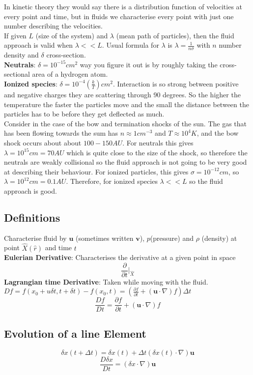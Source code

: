 \documentclass{article}
\begin{document}
In kinetic theory they would say there is a distribution function of velocities at every point and time, but in fluids we characterise every point with just one number describing the velocities.\\
If given $L$ (size of the system) and $\lambda$ (mean path of particles), then the fluid approach is valid when $\lambda << L$. Usual formula for $\lambda$ is $\lambda = \frac{1}{n\sigma}$ with $n$ number density and $\delta$ cross-section.\\
\textbf{Neutrals}:
$\delta = 10^{-15} cm^2$ way you figure it out is by roughly taking the cross-sectional area of a hydrogen atom.\\
\textbf{Ionized species}: $\delta = 10^{-4} \left( \frac{k}{T} \right) cm^2$. Interaction is so strong between positive and negative charges they are scattering through 90 degrees. So the higher the temperature the faster the particles move and the small the distance between the particles has to be before they get deflected as much.\\
Consider in the case of the bow and termination shocks of the sun. The gas that has been flowing towards the sum has $n \approx 1 cm^{-3}$ and $T \approx 10^4K$, and the bow shock occurs about about $100-150 AU$. For neutrals this gives $\lambda = 10^{15} cm = 70 AU$ which is quite close to the size of the shock, so therefore the neutrals are weakly collisional so the fluid approach is not going to be very good at describing their behaviour. For ionized particles, this gives $\sigma = 10^{-12} cm$, so $\lambda = 10^{12}cm = 0.1AU$. Therefore, for ionized species $\lambda << L$ so the fluid approach is good.\\
\subsection{Definitions}
Characterise fluid by $\bm u$ (sometimes written $\bm v$), $p$(pressure) and $\rho$ (density) at point $\hat X (\hat r)$ and time $t$\\
\textbf{Eulerian Derivative}: Characterises the derivative at a given point in space\\ $$\frac{\partial}{\partial t}|_{\hat X}$$
\textbf{Lagrangian time Derivative}: Taken while moving with the fluid. $Df = f(x_0 + u\delta t,t+\delta t) - f(x_0, t) =  (\frac{\partial f}{\partial t}  + (\bm u \cdot \nabla) f) \Delta t$\\
$$
\frac{Df}{Dt} = \frac{\partial f}{\partial t}  + (\bm u \cdot \nabla) f 
$$
\subsection{Evolution of a line Element}
$$
\delta x(t+\Delta t) = \delta x(t) + \Delta t (\delta x(t) \cdot \nabla) \bm u 
$$
$$
\frac{D \delta x}{Dt} = (\delta x \cdot \nabla) \bm u 
$$
\end{document}
